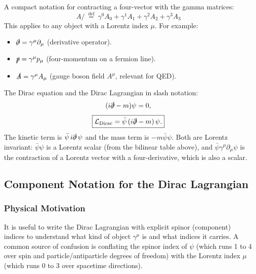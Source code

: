 \documentclass[../main.tex]{subfiles}
\begin{document}
A compact notation for contracting a four-vector with the gamma matrices:
\begin{equation}
  \boxed{{\displaystyle {A\!\!\!/}\ {\stackrel {\mathrm {def} }{=}}\ \gamma ^{0}A_{0}+\gamma ^{1}A_{1}+\gamma ^{2}A_{2}+\gamma ^{3}A_{3}}}
  \label{eq:lec08:slash-def}
\end{equation}
This applies to any object with a Lorentz index $\mu$.  For example:
\begin{itemize}
  \item $\slashed{\partial} = \gamma^\mu\partial_\mu$ (derivative operator).
  \item $\slashed{p} = \gamma^\mu p_\mu$ (four-momentum on a fermion line).
  \item $\slashed{A} = \gamma^\mu A_\mu$ (gauge boson field $A^\mu$, relevant for QED).
\end{itemize}

The Dirac equation and the Dirac Lagrangian in slash notation:
\begin{equation}
  (i\slashed\partial - m)\psi = 0,
  \label{eq:lec08:dirac-slash}
\end{equation}
\begin{equation}
  \boxed{\mathcal{L}_{\rm Dirac} = \bar\psi\,(i\slashed\partial - m)\,\psi.}
  \label{eq:lec08:Lagr-slash}
\end{equation}
The kinetic term is $\bar\psi\,i\slashed\partial\,\psi$ and the mass term is $-m\bar\psi\psi$.  Both are Lorentz invariant: $\bar\psi\psi$ is a Lorentz scalar (from the bilinear table above), and $\bar\psi\gamma^\mu\partial_\mu\psi$ is the contraction of a Lorentz vector with a four-derivative, which is also a scalar.

\subsection*{Component Notation for the Dirac Lagrangian}

\subsubsection*{Physical Motivation}

It is useful to write the Dirac Lagrangian with explicit spinor (component) indices to understand what kind of object $\gamma^\mu$ is and what indices it carries.  A common source of confusion is conflating the spinor index of $\psi$ (which runs 1 to 4 over spin and particle/antiparticle degrees of freedom) with the Lorentz index $\mu$ (which runs 0 to 3 over spacetime directions).
\end{document}
